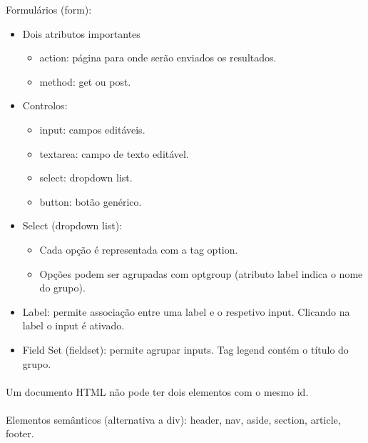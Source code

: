\documentclass[../resumosLTW.tex]{subfiles}
\begin{document}
Formulários (form):
\begin{itemize}
    \item Dois atributos importantes
    \begin{itemize}
        \item action: página para onde serão enviados os resultados.
        \item method: get ou post.
    \end{itemize}
    \item Controlos:
    \begin{itemize}
        \item input: campos editáveis.
        \item textarea: campo de texto editável.
        \item select: dropdown list.
        \item button: botão genérico.
    \end{itemize}
    \item Select (dropdown list):
    \begin{itemize}
        \item Cada opção é representada com a tag option.
        \item Opções podem ser agrupadas com optgroup (atributo label indica o nome do grupo).
    \end{itemize}
    \item Label: permite associação entre uma label e o respetivo input. Clicando na label o input é ativado.
    \item Field Set (fieldset): permite agrupar inputs. Tag legend contém o título do grupo.
\end{itemize}

\paragraph{}

Um documento HTML não pode ter dois elementos com o mesmo id.

\paragraph{}

Elementos semânticos (alternativa a div): header, nav, aside, section, article, footer.
\end{document}
